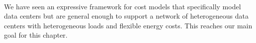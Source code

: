 
\paragraph{} We have seen an expressive framework for cost models that specifically model data centers but are general enough to support a network of heterogeneous data centers with heterogeneous loads and flexible energy costs. This reaches our main goal for this chapter.
